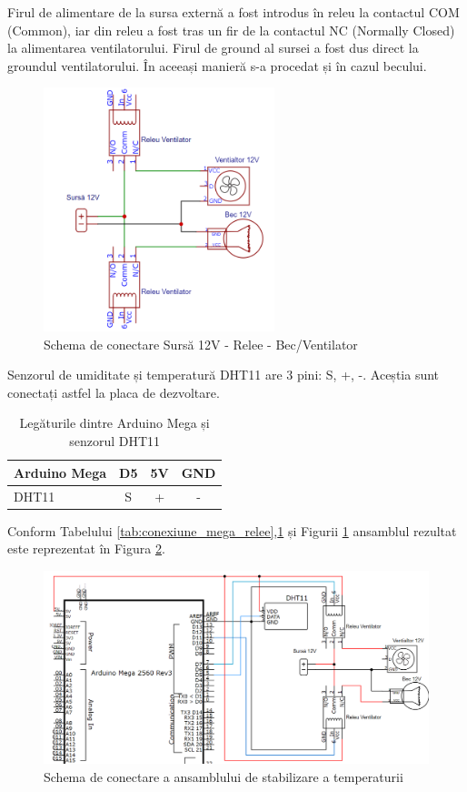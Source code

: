 Firul de alimentare de la sursa externă a fost introdus în releu la contactul COM (Common), iar din releu a fost tras un fir de la contactul NC (Normally Closed) la alimentarea ventilatorului. Firul de ground al sursei a fost dus direct la groundul ventilatorului. În aceeași manieră s-a procedat și în cazul becului.
\begin{figure}[H]
\includegraphics[width=0.6\textwidth, height=0.6\textwidth]{bachelors_ro/images/conexiune_relee_bec_vent.png}
\caption{Schema de conectare Sursă 12V - Relee - Bec/Ventilator}
\label{fig:conexiune_relee_bec_vent}
\end{figure}

Senzorul de umiditate și temperatură DHT11 are 3 pini: S, +, -. Aceștia sunt conectați astfel la placa de dezvoltare.

\begin{table}[H]
\caption{Legăturile dintre Arduino Mega și senzorul DHT11}
\label{tab:conexiune_mega_dht11}
\begin{tabular}{|l|c|c|c|}
\hline
Arduino Mega & D5 & 5V & GND \\ \hline
DHT11 & S & + & - \\ \hline
\end{tabular}
\end{table}

Conform Tabelului \ref{tab:conexiune_mega_relee},\ref{tab:conexiune_mega_dht11} și Figurii \ref{fig:conexiune_relee_bec_vent} ansamblul rezultat este reprezentat în Figura \ref{fig:conexiune_ansamblu_temp}.

\begin{figure}[H]
\includegraphics[width=1\linewidth]{bachelors_ro/images/conexiune_ansamblu_temp.png}
\caption{Schema de conectare a ansamblului de stabilizare a temperaturii}
\label{fig:conexiune_ansamblu_temp}
\end{figure}

